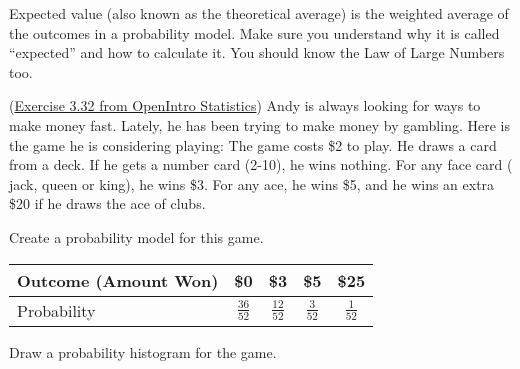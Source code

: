 \documentclass[12pt,answers]{exam}
\newcounter{countA}
\begin{document}
Expected value (also known as the theoretical average) is the weighted
average of the outcomes in a probability model. Make sure you understand
why it is called ``expected'' and how to calculate it. You should know
the Law of Large Numbers too.

\begin{questions}
\setcounter{question}{\value{countA}}

\item
  (\href{http://people.hsc.edu/faculty-staff/blins/books/OpenIntroStats4e.pdf\#eoce.3.32}{Exercise 3.32 from OpenIntro Statistics}) Andy is always looking for ways to make money fast. Lately, he has
  been trying to make money by gambling. Here is the game he is
  considering playing: The game costs \$2 to play. He draws a card from
  a deck. If he gets a number card (2-10), he wins nothing. For any face
  card ( jack, queen or king), he wins \$3. For any ace, he wins \$5,
  and he wins an extra \$20 if he draws the ace of clubs.

  \begin{parts}
  \item
    Create a probability model for this game.
\begin{solution}
\begin{center}
  \renewcommand{\arraystretch}{1.5}
\begin{tabular}{l|c|c|c|c}
Outcome (Amount Won) & \$0 & \$3 & \$5 & \$25 \\ \hline
Probability & $\frac{36}{52}$ & $\frac{12}{52}$ & $\frac{3}{52}$ & $\frac{1}{52}$
\end{tabular}
\end{center}
\end{solution}
\vfill
  \item
    Draw a probability histogram for the game.
\begin{solution}
\begin{center}


\end{center}
\end{solution}
\end{parts}
\end{questions}
\end{document}

